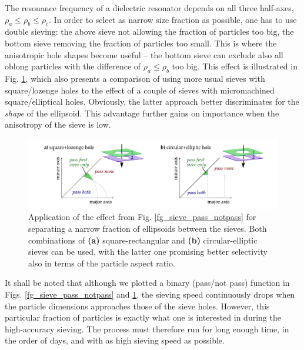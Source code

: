 The resonance frequency of a dielectric resonator depends on all three half-axes, $\rho_a \leq \rho_b \leq \rho_c$. In order to select as narrow size fraction as possible, one has to use double sieving: the above sieve not allowing the fraction of particles too big, the bottom sieve removing the fraction of particles too small. This is where the anisotropic hole shapes become useful -- the bottom sieve can exclude also all oblong particles with the difference of $\rho_a \leq \rho_b$ too big. This effect is illustrated in Fig. \ref{fg_double_sieving}, which also presents a comparison of using more usual sieves with square/lozenge holes to the effect of a couple of sieves with micromachined square/elliptical holes. Obviously, the latter approach better discriminates for the \textit{shape} of the ellipsoid. This advantage further gains on importance when the anisotropy of the sieve is low.

\begin{figure}[ht] \caption{Application of the effect from Fig. \ref{fg_sieve_pass_notpass} for separating a narrow fraction of ellipsoids between the sieves. Both combinations of \textbf{(a)} square-rectangular and \textbf{(b)} circular-elliptic sieves can be used, with the latter one promising better selectivity also in terms of the particle aspect ratio.} \label{fg_double_sieving} \centering 
\includegraphics[width=\textwidth]{img/technology/sieve_double_sieving_fractions.pdf}
\end{figure}
It shall be noted that although we plotted a binary (pass/not pass) function in Figs. \ref{fg_sieve_pass_notpass} and \ref{fg_double_sieving}, the sieving speed continuously drops when the particle dimensions approaches those of the sieve holes. 
However, this particular fraction of particles is exactly what one is interested in during the high-accuracy sieving. The process must therefore run for long enough time, in the order of days, and with as high sieving speed as possible.
